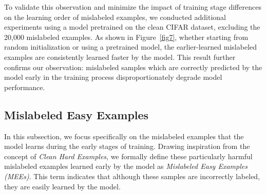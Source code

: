 
To validate this observation and minimize the impact of training stage differences on the learning order of mislabeled examples, we conducted additional experiments using a model pretrained on the clean CIFAR dataset, excluding the 20,000 mislabeled examples. As shown in Figure~\ref{fig7}, whether starting from random initialization or using a pretrained model, the earlier-learned mislabeled examples are consistently learned faster by the model. This result further confirms our observation: mislabeled samples which are correctly predicted by
the model early in the training process disproportionately degrade model performance.

\subsection{Mislabeled Easy Examples}
\label{sec2.2}

In this subsection, we focus specifically on the mislabeled examples that the model learns during the early stages of training. Drawing inspiration from the concept of \emph{Clean Hard Examples}, we formally define these particularly harmful mislabeled examples learned early by the model as \emph{Mislabeled Easy Examples (MEEs)}. This term indicates that although these samples are incorrectly labeled, they are easily learned by the model.

